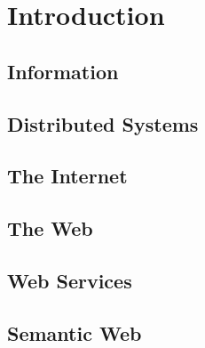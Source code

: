 \chapter{Introduction}

\section{Information}

\section{Distributed Systems}

\section{The Internet}

\section{The Web}

\section{Web Services}

\section{Semantic Web}